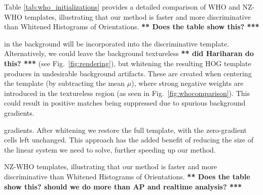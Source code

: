 \documentclass[10pt,twocolumn,letterpaper]{article}
\newcommand{\scream}[1]{{\color{red} \bf *** #1 ***}}
\begin{document}
Table \ref{tab:who_initializations} provides a detailed comparison of WHO and NZ-WHO templates, illustrating that our method is faster and more discriminative than Whitened Histograms of Orientations. \scream{Does the table show this?}


in the background will be incorporated into the discriminative template.
Alternatively, we could leave the background textureless \scream{did Hariharan
do this?} (see Fig.~\ref{fig:rendering}), but whitening the resulting HOG
template produces in undesirable background artifacts. These are created when
centering the template (by subtracting the mean $\mu$), where strong negative
weights are introduced in the textureless region (as seen in
Fig.~\ref{fig:whocomparison}). This could result in positive matches being
suppressed due to spurious background gradients.

gradients. After whitening we restore the full template, with the zero-gradient
cells left unchanged. This approach has the added benefit of reducing the size
of the linear system we need to solve, further speeding up our method.

NZ-WHO templates, illustrating that our method is faster and more
discriminative than Whitened Histograms of Orientations. \scream{Does the table
show this? should we do more than AP and realtime analysis?}




\end{document}
